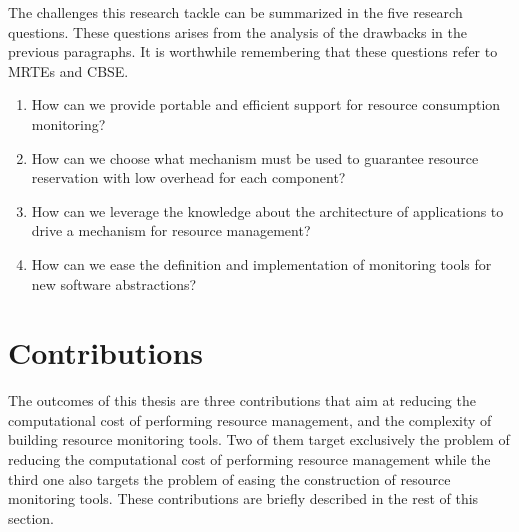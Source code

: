 The challenges this research tackle can be summarized in the five research questions.
These questions arises from the analysis of the drawbacks in the previous paragraphs.
It is worthwhile remembering that these questions refer to MRTEs and CBSE.

\begin{enumerate}
\renewcommand{\theenumi}{\textit{RQ\arabic{enumi}}}

\item How can we provide portable and efficient support for resource consumption monitoring?

\item How can we choose what mechanism must be used to guarantee resource reservation with low overhead for each component?
\begin{comment}
\item How can we improve resource management efficiency by relying on the fact that many applications are built on top of component models?
\end{comment}

\item How can we leverage the knowledge about the architecture of applications to drive a mechanism for resource management?

\item How can we ease the definition and implementation of monitoring tools for new software abstractions?
\end{enumerate}
 
\section{Contributions}

The outcomes of this thesis are three contributions that aim at reducing the computational cost of performing resource management, and the complexity of building resource monitoring tools.
Two of them target exclusively the problem of reducing the computational cost of performing resource management while the third one also targets the problem of easing the construction of resource monitoring tools. 
These contributions are briefly described in the rest of this section.

